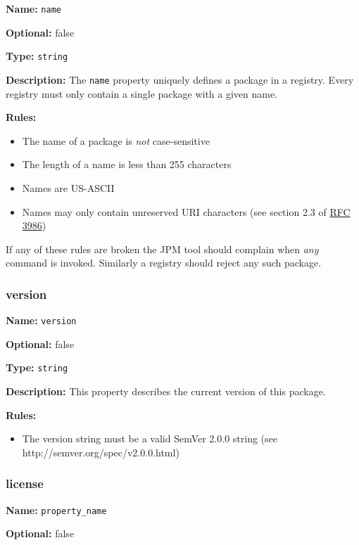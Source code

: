 \textbf{Name:} \texttt{name}

\textbf{Optional:} false

\textbf{Type:} \texttt{string}

\textbf{Description:} The \texttt{name} property uniquely defines a
package in a registry. Every registry must only contain a single package
with a given name.

\textbf{Rules:}

\begin{itemize}
\tightlist
\item
  The name of a package is \emph{not} case-sensitive
\item
  The length of a name is less than 255 characters
\item
  Names are US-ASCII
\item
  Names may only contain unreserved URI characters (see section 2.3 of
  \href{https://www.ietf.org/rfc/rfc3986.txt}{RFC 3986})
\end{itemize}

If any of these rules are broken the JPM tool should complain when
\emph{any} command is invoked. Similarly a registry should reject any
such package.

\hypertarget{version}{\subsubsection{version}\label{version}}

\textbf{Name:} \texttt{version}

\textbf{Optional:} false

\textbf{Type:} \texttt{string}

\textbf{Description:} This property describes the current version of
this package.

\textbf{Rules:}

\begin{itemize}
\tightlist
\item
  The version string must be a valid SemVer 2.0.0 string (see
  http://semver.org/spec/v2.0.0.html)
\end{itemize}

\hypertarget{license}{\subsubsection{license}\label{license}}

\textbf{Name:} \texttt{property\_name}

\textbf{Optional:} false

